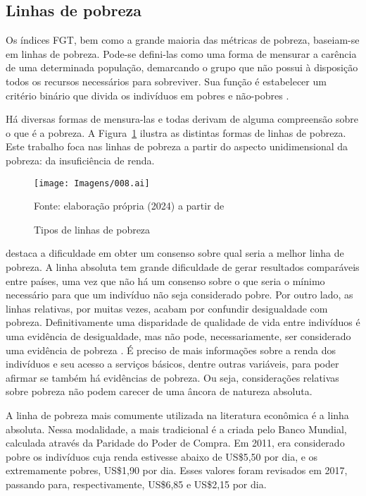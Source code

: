 \subsection{Linhas de pobreza}

Os índices FGT, bem como a grande maioria das métricas de pobreza, baseiam-se em linhas de pobreza. Pode-se defini-las como uma forma de mensurar a carência de uma determinada população, demarcando o grupo que não possui à disposição todos os recursos necessários para sobreviver. Sua função é estabelecer um critério binário que divida os indivíduos em pobres e não-pobres \cite{soares09}.

Há diversas formas de mensura-las e todas derivam de alguma compreensão sobre o que é a pobreza. A Figura~\ref{fig:linhas_pobreza} ilustra as distintas formas de linhas de pobreza. Este trabalho foca nas linhas de pobreza a partir do aspecto unidimensional da pobreza: da insuficiência de renda.

\begin{figure}[h]
	\centering
	\texttt{[image: Imagens/008.ai]}
	\caption{Tipos de linhas de pobreza}
	\label{fig:linhas_pobreza}
	\footnotesize
	Fonte: elaboração própria (2024) a partir de \textcite{soares09}
\end{figure}

\textcite{soares09} destaca a dificuldade em obter um consenso sobre qual seria a melhor linha de pobreza. A linha absoluta tem grande dificuldade de gerar resultados comparáveis entre países, uma vez que não há um consenso sobre o que seria o mínimo necessário para que um indivíduo não seja considerado pobre. Por outro lado, as linhas relativas, por muitas vezes, acabam por confundir desigualdade com pobreza. Definitivamente uma disparidade de qualidade de vida entre indivíduos é uma evidência de desigualdade, mas não pode, necessariamente, ser considerado uma evidência de pobreza \textcite{sen83}. É preciso de mais informações sobre a renda dos indivíduos e seu acesso a serviços básicos, dentre outras variáveis, para poder afirmar se também há evidências de pobreza. Ou seja, considerações relativas sobre pobreza não podem carecer de uma âncora de natureza absoluta.

A linha de pobreza mais comumente utilizada na literatura econômica é a linha absoluta. Nessa modalidade, a mais tradicional é a criada pelo Banco Mundial, calculada através da Paridade do Poder de Compra. Em 2011, era considerado pobre os indivíduos cuja renda estivesse abaixo de US\$5,50 por dia, e os extremamente pobres, US\$1,90 por dia. Esses valores foram revisados em 2017, passando para, respectivamente, US\$6,85 e US\$2,15 por dia.

